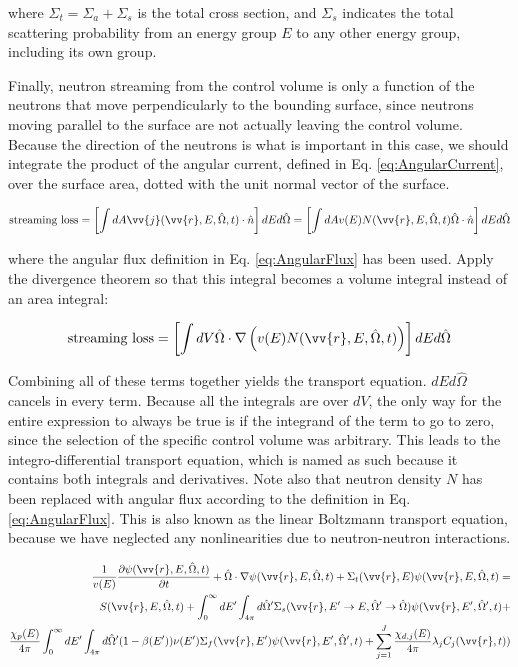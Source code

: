 \documentclass[10pt]{article}
\newcommand{\hO}{\hat{\Omega}}
\begin{document}
\begin{flushleft}
where \(\Sigma_t=\Sigma_a+\Sigma_s\) is the total cross section, and \(\Sigma_s\) indicates the total scattering probability from an energy group \(E\) to any other energy group, including its own group. 

Finally, neutron streaming from the control volume is only a function of the neutrons that move perpendicularly to the bounding surface, since neutrons moving parallel to the surface are not actually leaving the control volume. Because the direction of the neutrons is what is important in this case, we should integrate the product of the angular current, defined in Eq. \eqref{eq:AngularCurrent}, over the surface area, dotted with the unit normal vector of the surface. 

\begin{equation}
\label{eq:ConservationStreaming1}
\textrm{streaming loss} = \left\lbrack\int dA \vv{j}(\vv{r}, E, \hO  ,t)\cdot \hat{n}\right\rbrack dEd\hO  =\left\lbrack\int dA v(E)N(\vv{r}, E, \hO  ,t)\hO  \cdot \hat{n}\right\rbrack dEd\hO  
\end{equation}

where the angular flux definition in Eq. \eqref{eq:AngularFlux} has been used. Apply the divergence theorem so that this integral becomes a volume integral instead of an area integral:

\begin{equation}
\label{eq:ConservationStreaming2}
\textrm{streaming loss} =\left\lbrack\int dV \hO  \cdot\nabla\left(v(E)N(\vv{r}, E, \hO  ,t)\right)\right\rbrack dEd\hO  
\end{equation}

Combining all of these terms together yields the transport equation. \(dEd\hO  \) cancels in every term. Because all the integrals are over \(dV\), the only way for the entire expression to always be true is if the integrand of the term to go to zero, since the selection of the specific control volume was arbitrary. This leads to the integro-differential transport equation, which is named as such because it contains both integrals and derivatives. Note also that neutron density \(N\) has been replaced with angular flux according to the definition in Eq. \eqref{eq:AngularFlux}. This is also known as the linear Boltzmann transport equation, because we have neglected any nonlinearities due to neutron-neutron interactions. 

\begin{equation}
\label{eq:TE}
\begin{aligned}
\frac{1}{v(E)} \frac{\partial\psi(\vv{r}, E, \hO  ,t)}{\partial t} +
 \hO  \cdot\nabla\psi(\vv{r}, E, \hO  ,t) + 
 \Sigma_t(\vv{r},E)\psi(\vv{r}, E, \hO  ,t) = \\
S(\vv{r}, E, \hO  ,t) + \int_{0}^{\infty}dE' \int_{4\pi}^{ } d\hO  ' \Sigma_s(\vv{r}, E'\rightarrow E, \hO  '\rightarrow\hO  )\psi(\vv{r}, E', \hO  ',t) + \\
 \frac{\chi_p(E)}{4\pi} \int_{0}^{\infty} dE'\int_{4\pi}^{} d\hO  '(1-\beta(E'))\nu(E')\Sigma_f(\vv{r}, E')\psi(\vv{r}, E', \hO  ',t) + 
 \sum_{j = 1}^{J} \frac{\chi_{d,j}(E)}{4\pi} \lambda_j C_j(\vv{r}, t))
\end{aligned}
\end{equation}


\end{flushleft}
\end{document}

